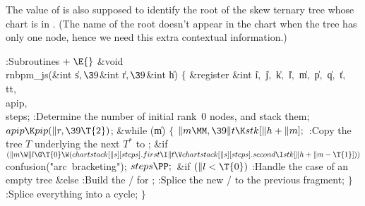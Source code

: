 The value of  is also supposed to identify
the root of the skew ternary tree whose chart is in .
(The name of the root doesn't appear in the chart when the tree has
only one node, hence we need this extra contextual information.)

\Y\B\4:Subroutines\X${}\mathrel+\E{}$\6
\&{void} \\{rnbpm\_js}(\&{int} \|s${},\39{}$\&{int} \|r${},\39{}$\&{int} \|h)\1%
\1\2\2\6
${}\{{}$\1\6
\&{register} \&{int} \|i${},{}$ \|j${},{}$ \|k${},{}$ \|l${},{}$ \|m${},{}$ %
\|p${},{}$ \|q${},{}$ \|t${},{}$ \\{tt}${},{}$ \\{apip}${},{}$ \\{steps};\7
:Determine the number  of initial rank~0 nodes, and stack them\X;\6
${}\\{apip}\K\\{pip}(\|r,\39\T{2}){}$;\6
\&{while} (\|m)\5
${}\{{}$\1\6
${}\|m\MM,\39\|t\K\\{stk}[\|h+\|m];{}$\6
:Copy the tree $T$ underlying the next $T^*$ to \X;\6
\&{if} ${}(\|m\W\|l\G\T{0}\W(\\{chartstack}[\|s][\\{steps}].\\{first}\I\|t\V%
\\{chartstack}[\|s][\\{steps}].\\{second}\I\\{stk}[\|h+\|m-\T{1}])){}$\1\5
\\{confusion}(\.{"arc\ bracketing"});\2\6
${}\\{steps}\PP;{}$\6
\&{if} ${}(\|l<\T{0}){}$\1\5
:Handle the case of an empty tree\X\2\6
\&{else}\1\5
:Build the \RNBPM/ for \X;\2\6
:Splice the new \RNBPM/ to the previous fragment\X;\6
\4${}\}{}$\2\6
:Splice everything into a cycle\X;\6
\4${}\}{}$\2\par
\fi

